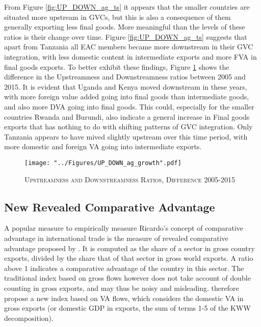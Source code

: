 \documentclass[a4paper]{article}
\begin{document}
From Figure \ref{fig:UP_DOWN_ag_ts} it appears that the smaller countries are situated more upstream in GVCs, but this is also a consequence of them generally exporting less final goods. More meaningful than the levels of these ratios is their change over time. Figure \ref{fig:UP_DOWN_ag_ts} suggests that apart from Tanzania all EAC members became more downstream in their GVC integration, with less domestic content in intermediate exports and more FVA in final goods exports. To better exhibit these findings, Figure \ref{fig:UP_DOWN_ag_growth} shows the difference in the Upstreamness and Downstreamness ratios between 2005 and 2015. It is evident that Uganda and Kenya moved downstream in these years, with more foreign value added going into final goods than intermediate goods, and also more DVA going into final goods. This could, especially for the smaller countries Rwanda and Burundi, also indicate a general increase in Final goods exports that has nothing to do with shifting patterns of GVC integration. %
Only Tanzania appears to have mived slightly upstream over this time period, with more domestic and foreign VA going into intermediate exports. 

\begin{figure}[h!]
\centering
\caption{\label{fig:UP_DOWN_ag_growth}\textsc{Upstreamness and Downstreamness Ratios, Difference 2005-2015}}
\texttt{[image: "../Figures/UP\_DOWN\_ag\_growth".pdf]} %
\end{figure}
\FloatBarrier


\subsection{New Revealed Comparative Advantage}
A popular measure to empirically measure Ricardo's concept of comparative advantage in international trade is the measure of revealed comparative advantage proposed by \citet{balassa1965trade}. It is computed as the share of a sector in gross country exports, divided by the share that of that sector in gross world exports. A ratio above 1 indicates a comparative advantage of the country in this sector. The traditional index based on gross flows however does not take account of double counting in gross exports, and may thus be noisy and misleading. \citet{koopman2014tracing} therefore propose a new index based on VA flows, which considers the domestic VA in gross exports (or domestic GDP in exports, the sum of terms 1-5 of the KWW decomposition). \newline
\end{document}
